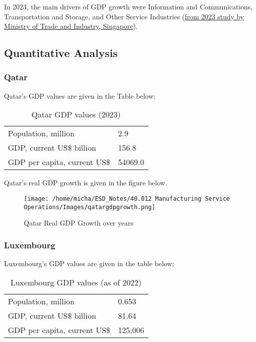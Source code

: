 \documentclass[12pt]{article}
\begin{document}
\noindent In 2023, the main drivers of GDP growth were Information and Communications, Transportation and Storage, and Other Service Industries (\href{https://www.mti.gov.sg/-/media/MTI/Resources/Economic-Survey-of-Singapore/2023/Economic-Survey-of-Singapore-2023/Ch1_AES2023.pdf}{from 2023 study by Ministry of Trade and Industry, Singapore}). 

\subsection*{Quantitative Analysis}

\subsubsection*{Qatar}

Qatar's GDP values are given in the Table below: 

\begin{table}[H]
    \centering
    \begin{tabular}{l l} \hline
        Population, million & 2.9 \\ 
        GDP, current US\$ billion & 156.8 \\ 
        GDP per capita, current US\$ & 54069.0 \\ \hline 
    \end{tabular}
    \caption{Qatar GDP values (2023)}
    \label{5-qatargdp}
\end{table}

\noindent Qatar's real GDP growth is given in the figure below. 

\begin{figure}[H]
    \centering
    \texttt{[image: /home/micha/ESD\_Notes/40.012 Manufacturing Service Operations/Images/qatargdpgrowth.png]}
    \caption{Qatar Real GDP Growth over years}
    \label{fig:5-qatargdp}
\end{figure} 

\subsubsection*{Luxembourg}

Luxembourg's GDP values are given in the table below: 

\begin{table}[H]
    \centering
    \begin{tabular}{l l} \hline
        Population, million & 0.653 \\ 
        GDP, current US\$ billion & 81.64 \\ 
        GDP per capita, current US\$ & 125,006 \\ \hline 
    \end{tabular}
    \caption{Luxembourg GDP values (as of 2022)}
    \label{5-luxgdp}
\end{table}
\end{document}
